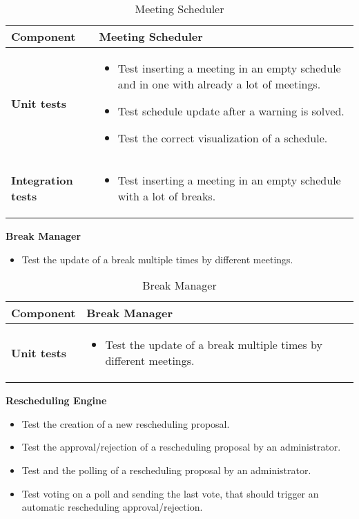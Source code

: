 \begin{table}[H]	
	\centering
	\def\arraystretch{1.5}
	\begin{tabular}{|m{4cm}|m{12cm}|}
		\hline
		\textbf{Component} & Meeting Scheduler \\ \hline
		\textbf{Unit tests} & 
			\begin{itemize}
			\item Test inserting a meeting in an empty schedule and in one with already a lot of meetings.
			\item Test schedule update after a warning is solved.
			\item Test the correct visualization of a schedule.
			\end{itemize} \\ \hline
		\textbf{Integration tests} & 
			\begin{itemize}
			\item Test inserting a meeting in an empty schedule with a lot of breaks.
			\end{itemize} \\ \hline
	\end{tabular}
	\caption{Meeting Scheduler}
\end{table}

\textbf{Break Manager}

\begin{itemize}
\item Test the update of a break multiple times by different meetings.
\end{itemize}

\begin{table}[H]	
	\centering
	\def\arraystretch{1.5}
	\begin{tabular}{|m{4cm}|m{12cm}|}
		\hline
		\textbf{Component} & Break Manager \\ \hline
		\textbf{Unit tests} & 
			\begin{itemize}
			\item Test the update of a break multiple times by different meetings.
			\end{itemize} \\ \hline
	\end{tabular}
	\caption{Break Manager}
\end{table}

\textbf{Rescheduling Engine}

\begin{itemize}
\item Test the creation of a new rescheduling proposal.
\item Test the approval/rejection of a rescheduling proposal by an administrator.
\item Test and the polling of a rescheduling proposal by an administrator.
\item Test voting on a poll and sending the last vote, that should trigger an automatic rescheduling approval/rejection.
\end{itemize}

